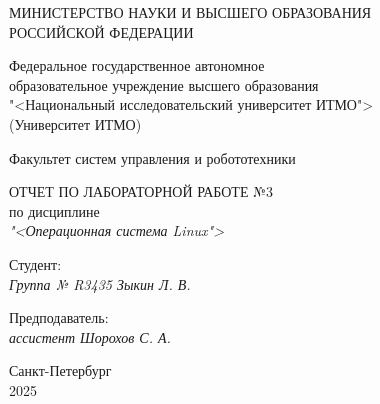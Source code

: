 \thispagestyle{empty}

\begin{center}
    МИНИСТЕРСТВО НАУКИ И ВЫСШЕГО ОБРАЗОВАНИЯ \\ РОССИЙСКОЙ ФЕДЕРАЦИИ

    \vspace{20pt}

    Федеральное государственное автономное \\ образовательное учреждение высшего образования \\
    "<Национальный исследовательский университет ИТМО"> \\
    (Университет ИТМО)

    \vspace{20pt}

    Факультет систем управления и робототехники
\end{center}

\vfill

\begin{center}
    ОТЧЕТ ПО ЛАБОРАТОРНОЙ РАБОТЕ №3\\  
    по дисциплине \\
    \textit{"<Операционная система Linux">}

    \vspace{20pt}

    
\end{center}

\vfill

    \noindent Студент: \\
    \textit{Группа № R3435 \hfill Зыкин Л. В.}

    \vspace{20pt}

    \noindent Предподаватель: \\
    \textit{ассистент \hfill Шорохов С. А.}

\vfill

\begin{center}
    Санкт-Петербург \\ 2025
\end{center}